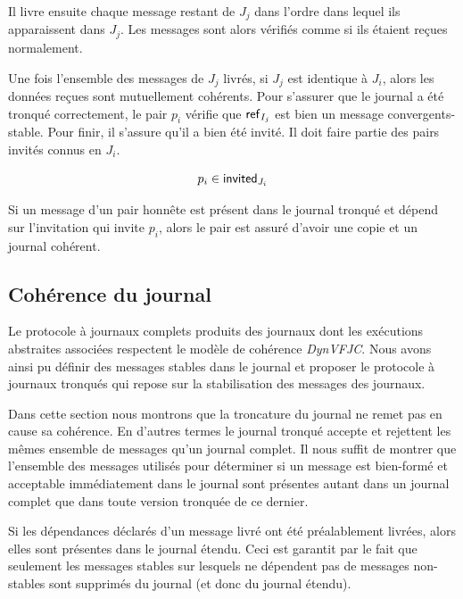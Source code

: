 Il livre ensuite chaque message restant de $J_j$ dans l'ordre dans lequel ils apparaissent dans $J_j$.
Les messages sont alors vérifiés comme si ils étaient reçues normalement.

Une fois l'ensemble des messages de $J_j$ livrés, si $J_j$ est identique à $J_i$, alors les données reçues sont mutuellement cohérents.
Pour s'assurer que le journal a été tronqué correctement, le pair $p_i$ vérifie que $\operatorname{\mathsf{ref}}_{I_j}$ est bien un message convergents-stable.
Pour finir, il s'assure qu'il a bien été invité.
Il doit faire partie des pairs invités connus en $J_i$.

\begin{equation*}
    p_i \in \operatorname{\mathsf{invited}}_{J_i}
\end{equation*}

Si un message d'un pair honnête est présent dans le journal tronqué et dépend sur l'invitation qui invite $p_i$, alors le pair est assuré d'avoir une copie et un journal cohérent.


\subsection{Cohérence du journal}

Le protocole à journaux complets produits des journaux dont les exécutions abstraites associées respectent le modèle de cohérence \emph{DynVFJC}.
Nous avons ainsi pu définir des messages stables dans le journal et proposer le protocole à journaux tronqués qui repose sur la stabilisation des messages des journaux.

Dans cette section nous montrons que la troncature du journal ne remet pas en cause sa cohérence.
En d'autres termes le journal tronqué accepte et rejettent les mêmes ensemble de messages qu'un journal complet.
Il nous suffit de montrer que l'ensemble des messages utilisés pour déterminer si un message est bien-formé et acceptable immédiatement dans le journal sont présentes autant dans un journal complet que dans toute version tronquée de ce dernier.

Si les dépendances déclarés d'un message livré ont été préalablement livrées, alors elles sont présentes dans le journal étendu.
Ceci est garantit par le fait que seulement les messages stables sur lesquels ne dépendent pas de messages non-stables sont supprimés du journal (et donc du journal étendu).

